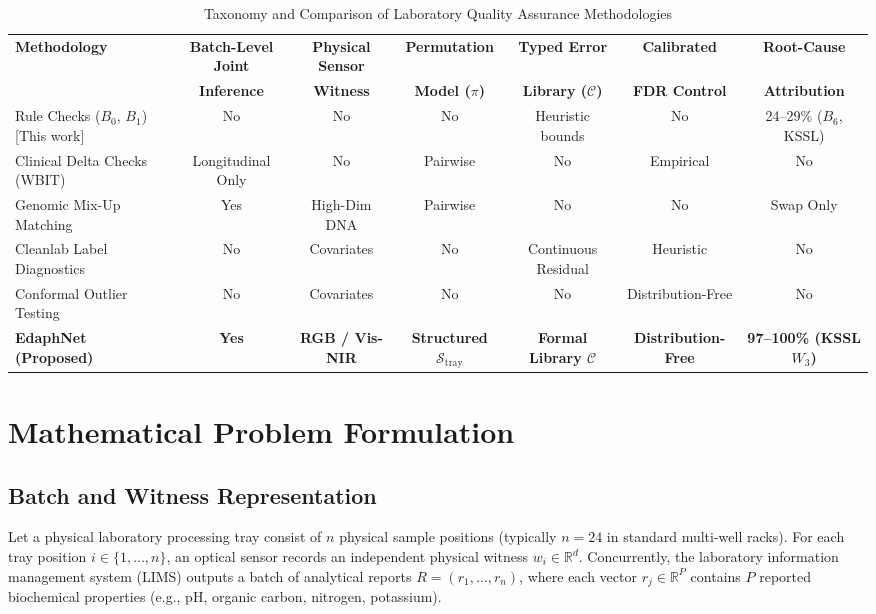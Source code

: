 \documentclass[journal,twoside]{IEEEtran}
\begin{document}
\begin{table}[!t]
\centering
\caption{Taxonomy and Comparison of Laboratory Quality Assurance Methodologies}
\label{tab:prior_art}
\begin{tabular}{lcccccc}
\toprule
\textbf{Methodology} & \textbf{Batch-Level Joint} & \textbf{Physical Sensor} & \textbf{Permutation} & \textbf{Typed Error} & \textbf{Calibrated} & \textbf{Root-Cause} \\
 & \textbf{Inference} & \textbf{Witness} & \textbf{Model ($\pi$)} & \textbf{Library ($\mathcal{C}$)} & \textbf{FDR Control} & \textbf{Attribution} \\
\midrule
Rule Checks ($B_0$, $B_1$) [This work] & No & No & No & Heuristic bounds & No & 24--29\% ($B_6$, KSSL) \\
Clinical Delta Checks (WBIT) \cite{rosenbaum2018machine} & Longitudinal Only & No & Pairwise & No & Empirical & No \\
Genomic Mix-Up Matching \cite{broman2015sample} & Yes & High-Dim DNA & Pairwise & No & No & Swap Only \\
Cleanlab Label Diagnostics \cite{zhou2024detecting} & No & Covariates & No & Continuous Residual & Heuristic & No \\
Conformal Outlier Testing \cite{bates2023conformal, jin2023selection} & No & Covariates & No & No & Distribution-Free & No \\
\textbf{EdaphNet (Proposed)} & \textbf{Yes} & \textbf{RGB / Vis-NIR} & \textbf{Structured $\mathcal{S}_{\text{tray}}$} & \textbf{Formal Library $\mathcal{C}$} & \textbf{Distribution-Free} & \textbf{97--100\% (KSSL $W_3$)} \\
\bottomrule
\end{tabular}
\end{table}

\section{Mathematical Problem Formulation}

\subsection{Batch and Witness Representation}
Let a physical laboratory processing tray consist of $n$ physical sample positions (typically $n = 24$ in standard multi-well racks). For each tray position $i \in \{1, \dots, n\}$, an optical sensor records an independent physical witness $w_i \in \mathbb{R}^d$. Concurrently, the laboratory information management system (LIMS) outputs a batch of analytical reports $R = (r_1, \dots, r_n)$, where each vector $r_j \in \mathbb{R}^P$ contains $P$ reported biochemical properties (e.g., pH, organic carbon, nitrogen, potassium).
\end{document}
